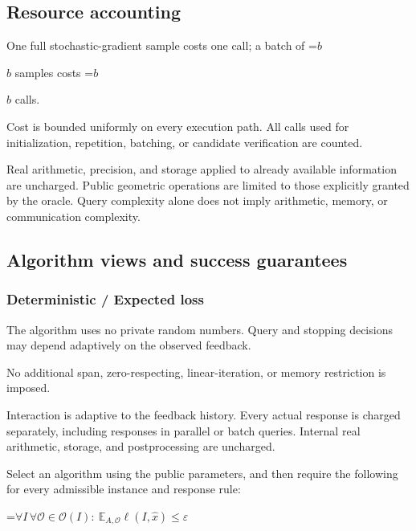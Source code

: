 \documentclass[10pt,a4paper]{article}
\newcommand{\AtlasMath}[1]{\par\begingroup\centering\setbox0=\hbox{$\displaystyle #1$}\ifdim\wd0>1.4\linewidth\typeout{ATLAS WIDE FORMULA: \the\wd0}\fi\ifdim\wd0>\linewidth\resizebox{\linewidth}{!}{\box0}\else\box0\fi\par\endgroup}
\newcommand{\AtlasInlineMath}[1]{\begingroup\setbox0=\hbox{$#1$}\ifdim\wd0>.4\linewidth\endgroup\AtlasMath{#1}\else\endgroup$#1$\fi}
\begin{document}
\subsection{Resource accounting}


One full stochastic-gradient sample costs one call; a batch of \AtlasInlineMath{b} samples costs \AtlasInlineMath{b} calls.



Cost is bounded uniformly on every execution path. All calls used for initialization, repetition, batching, or candidate verification are counted.



Real arithmetic, precision, and storage applied to already available information are uncharged. Public geometric operations are limited to those explicitly granted by the oracle. Query complexity alone does not imply arithmetic, memory, or communication complexity.



\subsection{Algorithm views and success guarantees}


\subsubsection{Deterministic / Expected loss}


The algorithm uses no private random numbers. Query and stopping decisions may depend adaptively on the observed feedback.



No additional span, zero-respecting, linear-iteration, or memory restriction is imposed.



Interaction is adaptive to the feedback history. Every actual response is charged separately, including responses in parallel or batch queries. Internal real arithmetic, storage, and postprocessing are uncharged.



Select an algorithm using the public parameters, and then require the following for every admissible instance and response rule:




\AtlasMath{\forall I\,\forall\mathcal{O}\in\mathcal{O}(I):\ \mathbb{E}_{A,\mathcal{O}}\ell(I,\widehat{x})\le\varepsilon}
\end{document}
